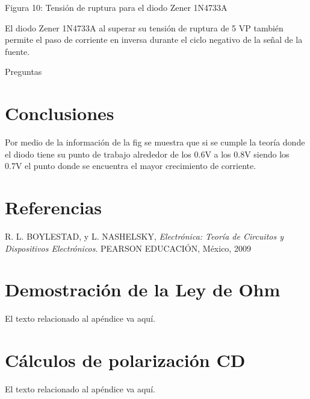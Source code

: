 \documentclass[journal]{IEEEtran}
\begin{document}
Figura 10: Tensión de ruptura para el diodo Zener 1N4733A



 El diodo Zener 1N4733A al superar su tensión de ruptura de 5 VP también permite el paso de corriente en inversa durante el ciclo negativo de la señal de
la fuente.



Preguntas







\section{Conclusiones}
 Por medio de la información de la fig se muestra que si se cumple la teoría donde el diodo tiene su punto de trabajo alrededor de los 0.6V a los 0.8V siendo los 0.7V el punto donde se encuentra el mayor crecimiento de corriente.
 
\section{Referencias}
R. L. BOYLESTAD, y L. NASHELSKY, 
\textit{Electrónica: Teoría de Circuitos
y Dispositivos Electrónicos}. PEARSON EDUCACIÓN, México, 2009
\appendices
\section{Demostración de la Ley de Ohm}
El texto relacionado al apéndice va aquí.

\section{Cálculos de polarización CD}
El texto relacionado al apéndice va aquí.
\end{document}
